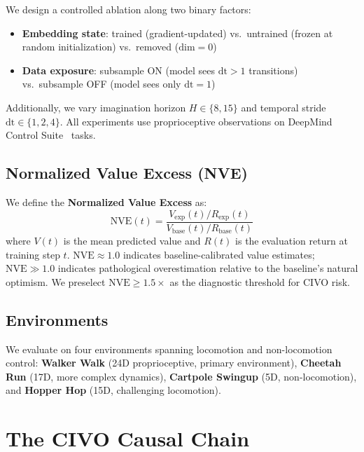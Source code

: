 \documentclass[10pt,letterpaper]{article}
\begin{document}
We design a controlled ablation along two binary factors:
\begin{itemize}[nosep,leftmargin=*]
\item \textbf{Embedding state}: trained (gradient-updated) vs.\ untrained (frozen at random initialization) vs.\ removed ($\mathrm{dim}=0$)
\item \textbf{Data exposure}: subsample ON (model sees $\mathrm{dt}>1$ transitions) vs.\ subsample OFF (model sees only $\mathrm{dt}=1$)
\end{itemize}
Additionally, we vary imagination horizon $H \in \{8, 15\}$ and temporal stride $\mathrm{dt} \in \{1, 2, 4\}$.
All experiments use proprioceptive observations on DeepMind Control Suite~\citep{tassa2018dmc} tasks.

\subsection{Normalized Value Excess (NVE)}

We define the \textbf{Normalized Value Excess} as:
\begin{equation}
\text{NVE}(t) = \frac{V_{\text{exp}}(t) / R_{\text{exp}}(t)}{V_{\text{base}}(t) / R_{\text{base}}(t)}
\end{equation}
where $V(t)$ is the mean predicted value and $R(t)$ is the evaluation return at training step $t$.
$\text{NVE} \approx 1.0$ indicates baseline-calibrated value estimates; $\text{NVE} \gg 1.0$ indicates pathological overestimation relative to the baseline's natural optimism.
We preselect $\text{NVE} \geq 1.5\times$ as the diagnostic threshold for CIVO risk.

\subsection{Environments}

We evaluate on four environments spanning locomotion and non-locomotion control:
\textbf{Walker Walk} (24D proprioceptive, primary environment),
\textbf{Cheetah Run} (17D, more complex dynamics),
\textbf{Cartpole Swingup} (5D, non-locomotion), and
\textbf{Hopper Hop} (15D, challenging locomotion).

\section{The CIVO Causal Chain}
\end{document}
